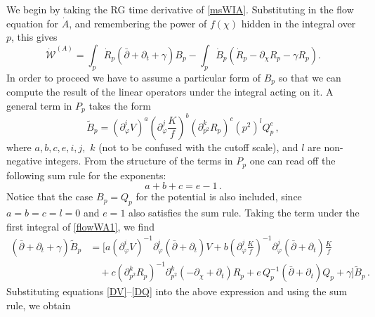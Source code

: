 \documentclass[11pt]{book} %
\begin{document}
We begin by taking the RG time derivative of \eqref{msWIA}. Substituting in the flow equation for $\dot A$, and remembering the power of $f(\chi)$ hidden in the integral over $p$, this gives
\begin{equation}
	\label{flowWA1}
	\dot{ \mathcal W } ^ {(A)} =
 	\int_p \dot R_p \left( \bar\partial + \partial_t + \gamma \right) B_p
 	- \int_p \dot B_p \left( \dot R_p - \partial_{\chi} R_p - \gamma R_p \right) .
\end{equation}
In order to proceed we have to assume a particular form of $B_p$ so that we can compute the result of the linear operators under the integral acting on it. A general term in $P_p$ takes the form
\begin{equation}
	\tilde B_p =
 	\left( \partial_{\varphi}^i V \right) ^ a
 	\left( \partial_{\varphi}^j \frac{K}{f} \right) ^ b
 	\left( \partial_{p^2}^k R_p \right) ^ c \left(p^2\right)^l Q_p^e \,,
\end{equation}
where $a,b,c,e,i,j,$ $k$ (not to be confused with the cutoff scale), and $l$ are non-negative integers. From the structure of the terms in $P_p$ one can read off the following sum rule for the exponents:
\begin{equation}
	a+b+c = e-1 \,.
\end{equation}
Notice that the case $B_p = Q_p$  for the potential is also included, since  $a=b=c=l=0$ and $e=1$ also satisfies the sum rule.
Taking the term under the first integral of \eqref{flowWA1}, we find
\begin{align}
\nonumber
	\left( \bar\partial + \partial_t + \gamma \right) \tilde B_p &=
	\bigg[a \left( \partial_{\varphi}^i V \right) ^ {-1} \partial_{\varphi}^i \left(  \bar\partial + \partial_t \right) V
	+ b \left( \partial_{\varphi}^j \frac{K}{f} \right) ^ {-1} \partial_{\varphi}^j
	 \left(  \bar\partial + \partial_t \right) \frac{K}{f} \\
	&\quad+ c \left( \partial_{p^2}^k R_p \right) ^ {-1} \partial_{p^2}^k \left( - \partial_{\chi} + \partial_t \right) R_p
	+ e \, Q_p^{-1} \left( \bar\partial + \partial_t \right) Q_p+ \gamma\bigg ] \tilde B_p \,.
\end{align}
Substituting equations \eqref{DV}--\eqref{DQ} into the above expression and using the sum rule, we obtain
\end{document}
